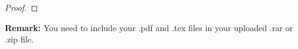\documentclass[12pt,a4paper]{article}
\theoremstyle{definition}
\begin{document}
\begin{enumerate}
\begin{proof}
   \end{proof}

\end{enumerate}

\vspace{20pt}

\textbf{Remark:} You need to include your .pdf and .tex files in your uploaded .rar or .zip file.

\end{document}
